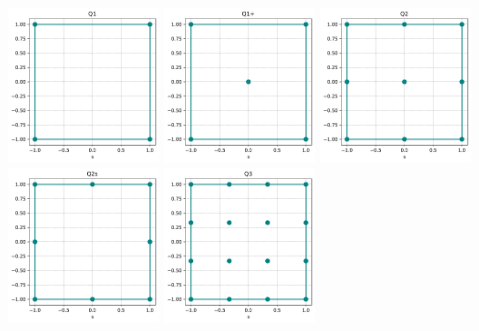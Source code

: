 \begin{center}
\includegraphics[width=4cm]{python_codes/fieldstone_120/spaces/Q1_nodes}
\includegraphics[width=4cm]{python_codes/fieldstone_120/spaces/Q1+_nodes}
\includegraphics[width=4cm]{python_codes/fieldstone_120/spaces/Q2_nodes}\\
\includegraphics[width=4cm]{python_codes/fieldstone_120/spaces/Q2s_nodes}
\includegraphics[width=4cm]{python_codes/fieldstone_120/spaces/Q3_nodes}

\end{center}
